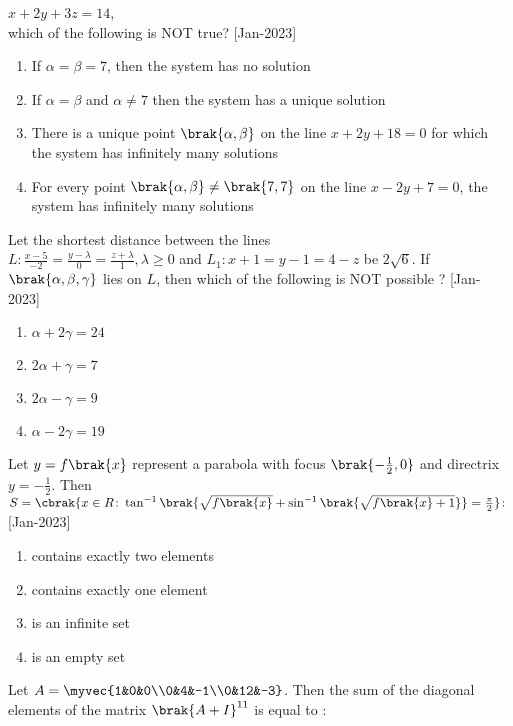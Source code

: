             $x+2y+3z=14$,\\
            which of the following is NOT true?
            \hfill{[Jan-2023]}
        \begin{enumerate}
            \item If $\alpha=\beta=7$, then the system has no solution
            \item If $\alpha=\beta$ and $\alpha\neq7$ then the system has a unique solution 
            \item There is a unique point $\brak{\alpha,\beta}$ on the line $x+2y+18=0$ for which the system has infinitely many solutions
            \item For every point $\brak{\alpha,\beta}\neq\brak{7,7}$ on the line $x-2y+7=0$, the system has infinitely many solutions
        \end{enumerate}
    \item Let the shortest distance between the lines \\
            $L\colon\frac{x-5}{-2}=\frac{y-\lambda}{0}=\frac{z+\lambda}{1},\lambda\geq0$ and $L_1\colon x+1=y-1=4-z$ be $2\sqrt{6}$. If $\brak{\alpha,\beta,\gamma}$ lies on $L$, then which of the following is NOT possible ?
            \hfill{[Jan-2023]}
        \begin{enumerate}
            \item $\alpha+2\gamma=24$
            \item $2\alpha+\gamma=7$
            \item $2\alpha-\gamma=9$
            \item $\alpha-2\gamma=19$
        \end{enumerate}
    \item Let $y=f\brak{x}$ represent a parabola with focus $\brak{-\frac{1}{2},0}$ and directrix $y=-\frac{1}{2}$. Then\\
    $S=\cbrak{x\in R\colon\tan^{-1}\brak{\sqrt{f\brak{x}}+\sin^{-1}\brak{\sqrt{f\brak{x}+1}}}=\frac{\pi}{2}}\colon$
    \hfill{[Jan-2023]}
        \begin{enumerate}
            \item contains exactly two elements
            \item contains exactly one element 
            \item is an infinite set
            \item is an empty set
        \end{enumerate}
    \item Let $A=\myvec{1&0&0\\0&4&-1\\0&12&-3}$. Then the sum of the diagonal elements of the matrix $\brak{A+I}^{11}$ is equal to $\colon$
